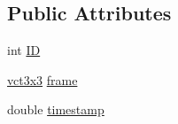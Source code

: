 \subsection*{Public Attributes}
\begin{DoxyCompactItemize}
\item 
int \hyperlink{classsvl_filter_image_overlay_types_1_1_image_transform_a0a6dbf36d0e3934007a0af762bbc4942}{I\-D}
\item 
\hyperlink{vct_fixed_size_matrix_types_8h_aac4a419dacf9282410675d42ebc86a7c}{vct3x3} \hyperlink{classsvl_filter_image_overlay_types_1_1_image_transform_acb473a9569970f365a0147ded7cd6bcc}{frame}
\item 
double \hyperlink{classsvl_filter_image_overlay_types_1_1_image_transform_aebc07597fe5d99cf5a2256e87f6f523c}{timestamp}
\end{DoxyCompactItemize}


